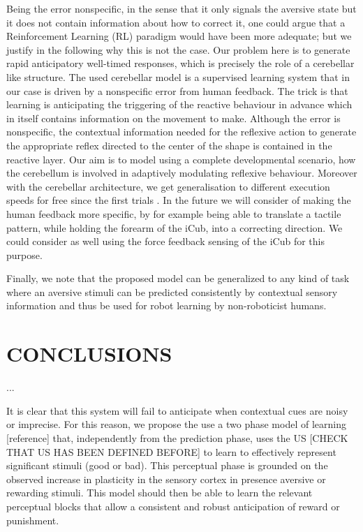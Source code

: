 \documentclass[letterpaper, 10 pt, conference]{ieeeconf}  %
\begin{document}
{Being the error nonspecific, in the sense that it only signals the aversive state but it does not contain information about how to correct it, one could argue that a Reinforcement Learning (RL) paradigm would have been more adequate; but we justify in the following why this is not the case. Our problem here is to generate rapid anticipatory well-timed responses, which is precisely the role of a cerebellar like structure.
The used cerebellar model \cite{herreros2013nucleo} is a supervised learning system that in our case is driven by a nonspecific error from human feedback. The trick is that learning is anticipating the triggering of the reactive behaviour in advance which in itself contains information on the movement to make. Although the error is nonspecific, the contextual information needed for the reflexive action to generate the appropriate reflex directed to the center of the shape is contained in the reactive layer. Our aim is to model using a complete developmental scenario, how the cerebellum is involved in adaptively modulating reflexive behaviour. Moreover with the cerebellar architecture, we get generalisation to different execution speeds for free since the first trials \cite{herreros2013speed}.  
In the future we will consider of making the human feedback more specific, by for example being able to translate a tactile pattern, while holding the forearm of the iCub, into a correcting direction. We could consider as well using the force feedback sensing of the iCub for this purpose.

Finally, we note that the proposed model can be generalized to any kind of task where an aversive stimuli can be predicted consistently by contextual sensory information and thus be used for robot learning by non-roboticist humans.



\section{CONCLUSIONS}
\label{sec:conclusions}

...

It is clear that this system will fail to anticipate when contextual cues are noisy or imprecise. For this reason, we propose the use a two phase model of learning [reference] that, independently from the prediction phase, uses the US [CHECK THAT US HAS BEEN DEFINED BEFORE] to learn to effectively represent significant stimuli (good or bad). This perceptual phase is grounded on the observed increase in plasticity in the sensory cortex in presence aversive or rewarding stimuli. This model should then be able to learn the relevant perceptual blocks that allow a consistent and robust anticipation of reward or punishment. 

}
\end{document}
